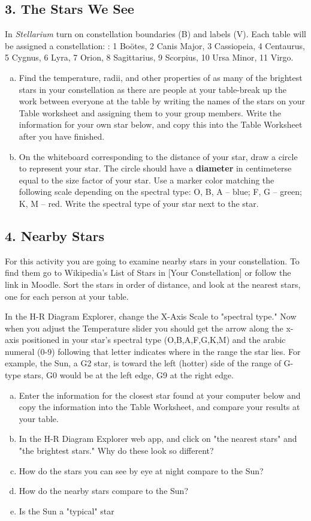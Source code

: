 \documentclass[main.tex]{subfiles}
\begin{document}
\subsection*{3. The Stars We See}
In \textit{Stellarium} turn on constellation boundaries (B) and labels (V). Each table will be assigned a constellation: : 1 Boötes, 2 Canis Major, 3 Cassiopeia, 4 Centaurus, 5 Cygnus, 6 Lyra, 7 Orion, 8 Sagittarius, 9 Scorpius, 10 Ursa Minor, 11 Virgo. \begin{enumerate} [a.]
    \item Find the temperature, radii, and other properties of as many of the brightest stars in your constellation as there are people at your table-break up the work between everyone at the table by writing the names of the stars on your Table worksheet and assigning them to your group members. Write the information for your own star below, and copy this into the Table Worksheet after you have finished. 
    \item On the whiteboard corresponding to the distance of your star, draw a circle to represent your star. The circle should have a \textbf{diameter} in centimeterse equal to the size factor of your star. Use a marker color matching the following scale depending on the spectral type: O, B, A – blue; F, G – green; K, M – red. Write the spectral type of your star next to the star.
\end{enumerate}

\subsection*{4. Nearby Stars}
For this activity you are going to examine nearby stars in your constellation. To find them go to Wikipedia's List of Stars in [Your Constellation] or follow the link in Moodle. Sort the stars in order of distance, and look at the nearest stars, one for each person at your table. 

In the H-R Diagram Explorer, change the X-Axis Scale to "spectral type." Now when you adjust the Temperature slider you should get the arrow along the x-axis positioned in your star's spectral type (O,B,A,F,G,K,M) and the arabic numeral (0-9) following that letter indicates where in the range the star lies. For example, the Sun, a G2 star, is toward the left (hotter) side of the range of G-type stars, G0 would be at the left edge, G9 at the right edge.
\begin{enumerate} [a.]
    \item Enter the information for the closest star found at your computer below and copy the information into the Table Worksheet, and compare your results at your table.
    \item In the H-R Diagram Explorer web app, and click on "the nearest stars" and "the brightest stars." Why do these look so different?
    \item How do the stars you can see by eye at night compare to the Sun?
    \item How do the nearby stars compare to the Sun?
    \item Is the Sun a "typical" star
\end{enumerate}
\end{document}
